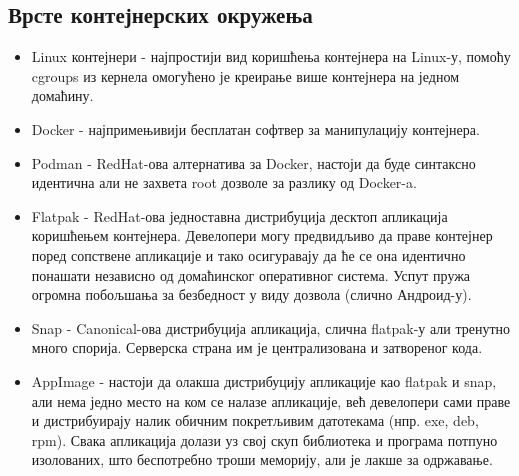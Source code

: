 \documentclass[a4paper,14pt]{article}
\begin{document}
\subsection{Врсте контејнерских окружења}
\begin{itemize}
\item Linux контејнери\cite{lxc} - најпростији вид коришћења контејнера на Linux-у, помоћу cgroups из кернела омогућено је креирање више контејнера на једном домаћину.
\item Docker\cite{docker} - најпримењивији бесплатан софтвер за манипулацију контејнера.
\item Podman\cite{podman} - RedHat-ова алтернатива за Docker, настоји да буде синтаксно идентична али не захвета root дозволе за разлику од Docker-a.
\item Flatpak\cite{flatpak} - RedHat-ова једноставна дистрибуција десктоп апликација коришћењем контејнера. Девелопери могу предвидљиво да праве контејнер поред сопствене апликације и тако осигуравају да ће се она идентично понашати независно од домаћинског оперативног система. Успут пружа огромна побољшања за безбедност у виду дозвола (слично Андроид-у).
\item Snap\cite{snap} - Canonical-ова дистрибуција апликација, слична flatpak-у али тренутно много спорија. Серверска страна им је централизована и затвореног кода.
\item AppImage\cite{appimage} - настоји да олакша дистрибуцију апликације као flatpak и snap, али нема једно место на ком се налазе апликације, већ девелопери сами праве и дистрибуирају налик обичним покретљивим датотекама (нпр. exe, deb, rpm). Свака апликација долази уз свој скуп библиотека и програма потпуно изолованих, што беспотребно троши меморију, али је лакше за одржавање.
\end{itemize}
\newpage
\end{document}
